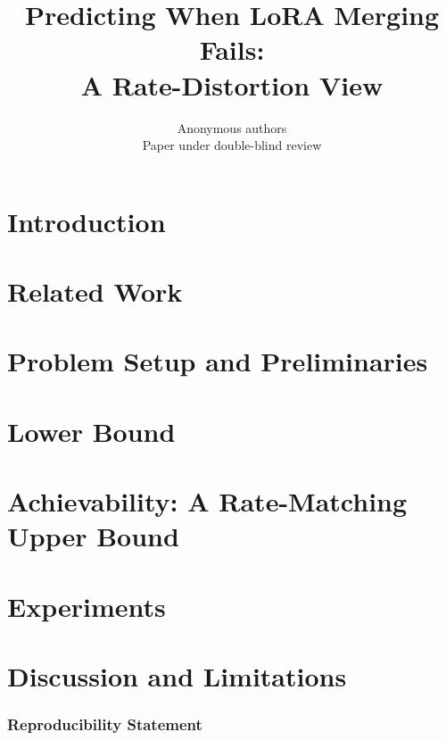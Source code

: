 \documentclass{article}
\title{Predicting When LoRA Merging Fails:\\A Rate-Distortion View}
\author{Anonymous authors\\
Paper under double-blind review}
\theoremstyle{definition}
\theoremstyle{remark}
\begin{document}
\maketitle

\begin{abstract}

\end{abstract}

\section{Introduction}


\section{Related Work}\label{sec:related_work}


\section{Problem Setup and Preliminaries}\label{sec:setup}


\section{Lower Bound}\label{sec:lower}\label{sec:lower_bound}


\section{Achievability: A Rate-Matching Upper Bound}\label{sec:achv}\label{sec:achievability}


\section{Experiments}\label{sec:exp}\label{sec:experiments}


\section{Discussion and Limitations}\label{sec:discussion}\label{sec:future}


\subsubsection*{Reproducibility Statement}

\end{document}
